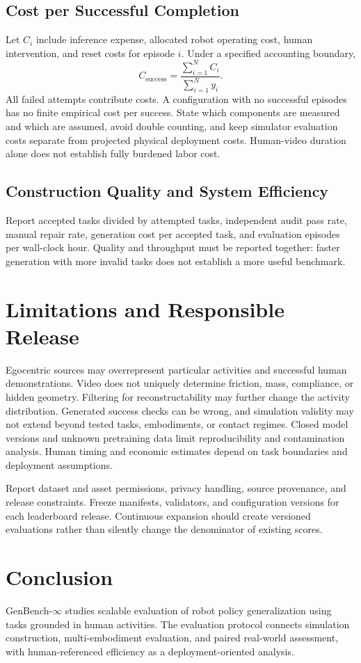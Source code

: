 \subsection{Cost per Successful Completion}
Let $C_i$ include inference expense, allocated robot operating cost, human intervention, and reset costs for episode $i$. Under a specified accounting boundary,
\begin{equation}
C_{\mathrm{success}}=\frac{\sum_{i=1}^{N}C_i}{\sum_{i=1}^{N}y_i}.
\end{equation}
All failed attempts contribute costs. A configuration with no successful episodes has no finite empirical cost per success. State which components are measured and which are assumed, avoid double counting, and keep simulator evaluation costs separate from projected physical deployment costs. Human-video duration alone does not establish fully burdened labor cost.

\subsection{Construction Quality and System Efficiency}
Report accepted tasks divided by attempted tasks, independent audit pass rate, manual repair rate, generation cost per accepted task, and evaluation episodes per wall-clock hour. Quality and throughput must be reported together: faster generation with more invalid tasks does not establish a more useful benchmark.

\section{Limitations and Responsible Release}
\label{sec:gb_limitations}
Egocentric sources may overrepresent particular activities and successful human demonstrations. Video does not uniquely determine friction, mass, compliance, or hidden geometry. Filtering for reconstructability may further change the activity distribution. Generated success checks can be wrong, and simulation validity may not extend beyond tested tasks, embodiments, or contact regimes. Closed model versions and unknown pretraining data limit reproducibility and contamination analysis. Human timing and economic estimates depend on task boundaries and deployment assumptions.

Report dataset and asset permissions, privacy handling, source provenance, and release constraints. Freeze manifests, validators, and configuration versions for each leaderboard release. Continuous expansion should create versioned evaluations rather than silently change the denominator of existing scores.

\section{Conclusion}
\label{sec:gb_conclusion}
GenBench-$\infty$ studies scalable evaluation of robot policy generalization using tasks grounded in human activities. The evaluation protocol connects simulation construction, multi-embodiment evaluation, and paired real-world assessment, with human-referenced efficiency as a deployment-oriented analysis.
